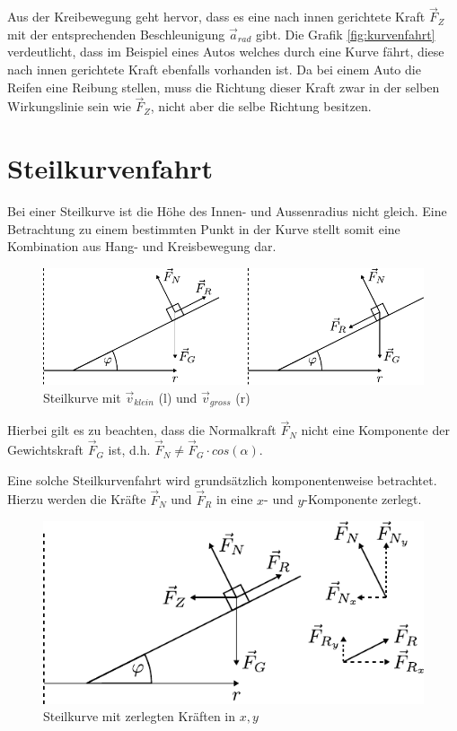 \noindent
Aus der Kreibewegung geht hervor, dass es eine nach innen gerichtete
Kraft $\vec{F}_Z$ mit der entsprechenden Beschleunigung $\vec{a}_{rad}$
gibt. Die Grafik \ref{fig:kurvenfahrt} verdeutlicht, dass im Beispiel 
eines Autos welches durch eine Kurve fährt, diese nach innen gerichtete 
Kraft ebenfalls vorhanden ist. Da bei einem Auto die Reifen eine Reibung 
stellen, muss die Richtung dieser Kraft zwar in der selben Wirkungslinie
sein wie $\vec{F}_Z$, nicht aber die selbe Richtung besitzen.  

\newpage
\section{Steilkurvenfahrt}
Bei einer Steilkurve ist die Höhe des Innen- und Aussenradius nicht
gleich. Eine Betrachtung zu einem bestimmten Punkt in der Kurve stellt
somit eine Kombination aus Hang- und Kreisbewegung dar. 

\begin{figure}[h!]
	\centering
	\includegraphics[scale=0.8]{../fig/kurve1.pdf}
	\caption{Steilkurve mit 
		$\vec{v}_{klein}$ (l) und $\vec{v}_{gross}$ (r)}
	\label{fig:steilkurve1}
\end{figure}

\noindent
Hierbei gilt es zu beachten, dass die Normalkraft $\vec{F}_N$ nicht 
eine Komponente der Gewichtskraft $\vec{F}_G$ ist, d.h. 
$\vec{F}_N \neq \vec{F}_G \cdot cos(\alpha)$. 

Eine solche Steilkurvenfahrt wird grundsätzlich komponentenweise
betrachtet. Hierzu werden die Kräfte $\vec{F}_N$ und $\vec{F}_R$ in
eine $x$- und $y$-Komponente zerlegt.

\begin{figure}[h!]
	\centering
	\includegraphics[scale=0.8]{../fig/kurve2.pdf}
	\caption{Steilkurve mit zerlegten Kräften in $x,y$}
	\label{fig:steilkurve2}
\end{figure}

